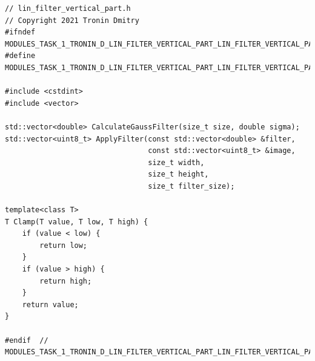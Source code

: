 \documentclass{report}
\begin{document}
\begin{lstlisting}[breaklines=true]
// lin_filter_vertical_part.h
// Copyright 2021 Tronin Dmitry
#ifndef MODULES_TASK_1_TRONIN_D_LIN_FILTER_VERTICAL_PART_LIN_FILTER_VERTICAL_PART_H_
#define MODULES_TASK_1_TRONIN_D_LIN_FILTER_VERTICAL_PART_LIN_FILTER_VERTICAL_PART_H_

#include <cstdint>
#include <vector>

std::vector<double> CalculateGaussFilter(size_t size, double sigma);
std::vector<uint8_t> ApplyFilter(const std::vector<double> &filter,
                                 const std::vector<uint8_t> &image,
                                 size_t width,
                                 size_t height,
                                 size_t filter_size);

template<class T>
T Clamp(T value, T low, T high) {
    if (value < low) {
        return low;
    }
    if (value > high) {
        return high;
    }
    return value;
}

#endif  // MODULES_TASK_1_TRONIN_D_LIN_FILTER_VERTICAL_PART_LIN_FILTER_VERTICAL_PART_H_

\end{lstlisting}
\end{document}
